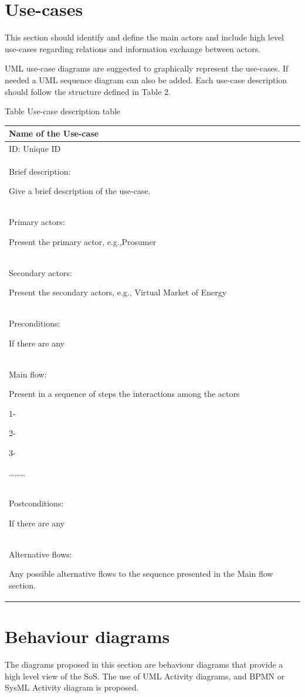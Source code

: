 \documentclass{article}
\newcounter{Table}
\renewcommand\theTable{\arabic{Table}}
\begin{document}
\section{Use-cases}
This section should identify and define the main actors and include high level use-cases regarding relations and information exchange between actors.

UML use-case diagrams are suggested to graphically represent the use-cases. If needed a UML sequence diagram can also be added. Each use-case description should follow the structure defined in Table 2.

Table \stepcounter{Table}{\theTable} Use-case description table

\begin{flushleft}
\tablefirsthead{}
\tablehead{}
\tabletail{}
\tablelasttail{}
\begin{supertabular}{|m{6.01226in}|}
\hline
Name of the Use-case\\\hline
ID: Unique ID\\\hline
Brief description:

Give a brief description of the use-case.\\\hline
Primary actors:

Present the primary actor, e.g.,Prosumer\\\hline
Secondary actors:

Present the secondary actors, e.g., Virtual Market of Energy\\\hline
Preconditions:

If there are any\\\hline
Main flow:

Present in a sequence of steps the interactions among the actors 

1-

2-

3-

{\dots}{\dots}{\dots}\\\hline
Postconditions:

If there are any\\\hline
Alternative flows:

Any possible alternative flows to the sequence presented in the Main flow section.\\\hline
\end{supertabular}
\end{flushleft}
\section{Behaviour diagrams}
The diagrams proposed in this section are behaviour diagrams that provide a high level view of the SoS. The use of UML Activity diagrams, and BPMN or SysML Activity diagram is proposed.
\end{document}

